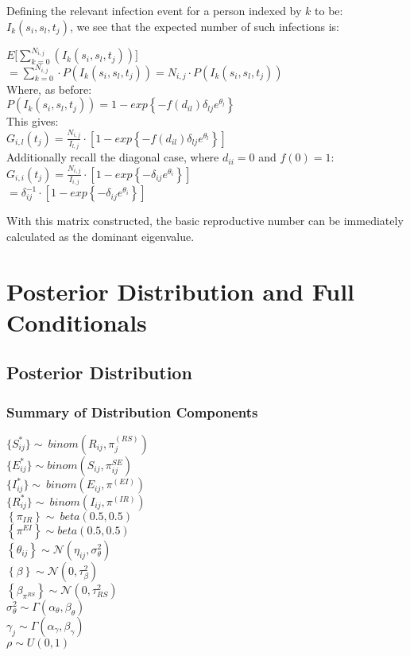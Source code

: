 \documentclass[12pt]{article}
\newcommand \noi {\noindent}
\newcommand \mbreak {\\ \vspace{0.1in}}
\begin{document}
Defining the relevant infection event for a person indexed by $k$ to be: $I_k(s_i, s_l, t_j)$, we see that the expected number of such
infections is:

\begin{center}
    $\displaystyle E\big[ \sum_{k=0}^{N_{i,j}}(I_k(s_i, s_l, t_j)) \big]$ \mbreak
    $\displaystyle = \sum_{k=0}^{N_{i,j}}\cdot P(I_k(s_i, s_l, t_j)) = N_{i,j}\cdot P(I_k(s_i, s_l, t_j)) $ \mbreak 
    Where, as before: \mbreak
    $ P(I_k(s_i, s_l, t_j)) = 1-exp\left\{-f(d_{il})\delta_{lj}e^{\theta_{l}} \right\}$ \mbreak
    This gives: \mbreak
    $G_{i,l}(t_j) = \frac{N_{i,j}}{I_{l,j}}\cdot \left[1-exp\left\{-f(d_{il})\delta_{lj}e^{\theta_{l}} \right\}\right]$ \mbreak
    Additionally recall the diagonal case, where $d_{ii} = 0$ and $f(0) = 1$:\mbreak 
    $G_{i,i}(t_j) = \frac{N_{i,j}}{I_{i,j}}\cdot \left[1-exp\left\{-\delta_{ij}e^{\theta_{i}} \right\}\right]$ \mbreak
    $ = \delta_{ij}^{-1}\cdot \left[1-exp\left\{-\delta_{ij}e^{\theta_{i}} \right\}\right]$ \mbreak


\end{center}

With this matrix constructed, the basic reproductive number can be immediately calculated as the dominant eigenvalue. 


\section{Posterior Distribution and Full Conditionals}

\subsection{Posterior Distribution}
\subsubsection{Summary of Distribution Components}
$\{S_{ij}^*\} \sim\  binom(R_{ij}, \pi_j^{(RS)})$\mbreak
$\{E_{ij}^*\} \sim binom(S_{ij}, \pi^{SE}_{ij})$ \mbreak
$\{I_{ij}^*\} \sim\  binom(E_{ij}, \pi^{(EI)})$\mbreak
$\{R_{ij}^*\} \sim\  binom(I_{ij}, \pi^{(IR)})$\mbreak
\noi
$\left\{\pi_{IR}  \right\} \sim\ beta(0.5, 0.5)$\mbreak 
$\left\{\pi^{EI}  \right\} \sim beta(0.5, 0.5)$\mbreak 
$\left\{ \theta_{ij}\right\} \sim \mathcal{N}(\eta_{ij}, \sigma^2_{\theta})$ \mbreak
$\left\{ \beta \right\} \sim \mathcal{N}(0, \tau^2_\beta) $\mbreak 
$\left\{ \beta_{\pi^{RS}} \right\} \sim \mathcal{N}(0, \tau^2_{RS}) $\mbreak 
$\sigma^2_{\theta} \sim \Gamma(\alpha_\theta, \beta_\theta)$\mbreak
$\gamma_j \sim \Gamma(\alpha_\gamma, \beta_\gamma)$\mbreak
$\rho \sim U(0,1)$
\end{document}
